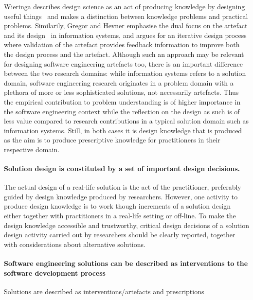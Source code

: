 \documentclass[graybox]{svmult}
\begin{document}
Wieringa describes design science as an act of producing knowledge by designing useful things~\cite{wieringa_design_2009} and makes a distinction between knowledge problems and practical problems. Similarily, Gregor and Hevner emphasise the dual focus on the artefact and its design~\cite{gregor_positioning_2013} in information systems, and argues for an iterative design process where validation of the artefact provides feedback information to improve both the design process and the artefact. Although such an approach may be relevant for designing software engineering artefacts too, there is an important difference between the two research domains: while information systems refers to a solution domain, software engineering research originates in a problem domain with a plethora of more or less sophisticated solutions, not necessarily artefacts. Thus the empirical contribution to problem understanding is of higher importance in the software engineering context while the reflection on the design as such is of less value compared to research contributions in a typical solution domain such as information systems. Still, in both cases it is design knowledge that is produced as the aim is to produce prescriptive knowledge for practitioners in their respective domain. 

\paragraph{Solution design is constituted by a set of important design decisions.}  The actual design of a real-life solution is the act of the practitioner, preferably guided by design knowledge produced by researchers. However, one activity to produce design knowledge is to work though increments of a solution design either together with practitioners in a real-life setting or off-line. To make the design knowledge accessible and trustworthy, critical design decisions of a solution design activity carried out by researchers should be clearly reported, together with considerations about alternative solutions. 

\paragraph{Software engineering solutions can be described as interventions to the software development process}
Solutions are described as interventions/artefacts and prescriptions
\end{document}
